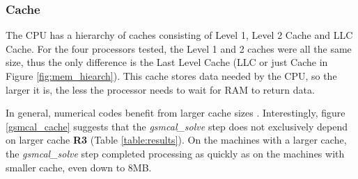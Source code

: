 \subsubsection{Cache}
The CPU has a hierarchy of caches consisting of Level 1, Level 2 Cache and LLC Cache. For the four processors tested, the Level 1 and 2 caches were all the same size, thus the only difference is the Last Level Cache (LLC or just Cache in Figure \ref{fig:mem_hiearch}). This cache stores data needed by the CPU, so the larger it is, the less the processor needs to wait for RAM to return data. 

In general, numerical codes benefit from larger cache sizes \citep{skadron1999branch,goto2008anatomy}. Interestingly,  figure \ref{gsmcal_cache} suggests that the \textit{gsmcal\_solve} step does not exclusively depend on larger cache \textbf{R3} (Table \ref{table:results}). On the machines with a larger cache, the \textit{gsmcal\_solve} step completed processing as quickly as on the machines with smaller cache, even down to 8MB.  

